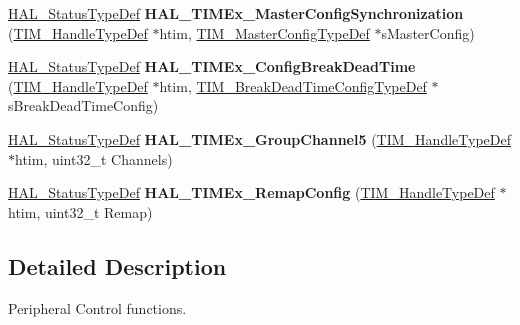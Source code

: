 \begin{DoxyCompactItemize}
\mbox{\label{group___t_i_m_ex___exported___functions___group5_ga056fd97d3be6c60dcfa12963f6ec8aad}} 
\mbox{\hyperlink{stm32f7xx__hal__def_8h_a63c0679d1cb8b8c684fbb0632743478f}{H\+A\+L\+\_\+\+Status\+Type\+Def}} {\bfseries H\+A\+L\+\_\+\+T\+I\+M\+Ex\+\_\+\+Master\+Config\+Synchronization} (\mbox{\hyperlink{struct_t_i_m___handle_type_def}{T\+I\+M\+\_\+\+Handle\+Type\+Def}} $\ast$htim, \mbox{\hyperlink{struct_t_i_m___master_config_type_def}{T\+I\+M\+\_\+\+Master\+Config\+Type\+Def}} $\ast$s\+Master\+Config)
\item 
\mbox{\label{group___t_i_m_ex___exported___functions___group5_ga4414f3b3dcbed3f21ee3b06d6db9ffa4}} 
\mbox{\hyperlink{stm32f7xx__hal__def_8h_a63c0679d1cb8b8c684fbb0632743478f}{H\+A\+L\+\_\+\+Status\+Type\+Def}} {\bfseries H\+A\+L\+\_\+\+T\+I\+M\+Ex\+\_\+\+Config\+Break\+Dead\+Time} (\mbox{\hyperlink{struct_t_i_m___handle_type_def}{T\+I\+M\+\_\+\+Handle\+Type\+Def}} $\ast$htim, \mbox{\hyperlink{struct_t_i_m___break_dead_time_config_type_def}{T\+I\+M\+\_\+\+Break\+Dead\+Time\+Config\+Type\+Def}} $\ast$s\+Break\+Dead\+Time\+Config)
\item 
\mbox{\label{group___t_i_m_ex___exported___functions___group5_ga8aef10325df17a0d17a3a0a7ebfae383}} 
\mbox{\hyperlink{stm32f7xx__hal__def_8h_a63c0679d1cb8b8c684fbb0632743478f}{H\+A\+L\+\_\+\+Status\+Type\+Def}} {\bfseries H\+A\+L\+\_\+\+T\+I\+M\+Ex\+\_\+\+Group\+Channel5} (\mbox{\hyperlink{struct_t_i_m___handle_type_def}{T\+I\+M\+\_\+\+Handle\+Type\+Def}} $\ast$htim, uint32\+\_\+t Channels)
\item 
\mbox{\label{group___t_i_m_ex___exported___functions___group5_ga683118282daf3aa2e319eb8eea93af31}} 
\mbox{\hyperlink{stm32f7xx__hal__def_8h_a63c0679d1cb8b8c684fbb0632743478f}{H\+A\+L\+\_\+\+Status\+Type\+Def}} {\bfseries H\+A\+L\+\_\+\+T\+I\+M\+Ex\+\_\+\+Remap\+Config} (\mbox{\hyperlink{struct_t_i_m___handle_type_def}{T\+I\+M\+\_\+\+Handle\+Type\+Def}} $\ast$htim, uint32\+\_\+t Remap)
\end{DoxyCompactItemize}


\subsection{Detailed Description}
Peripheral Control functions. 

